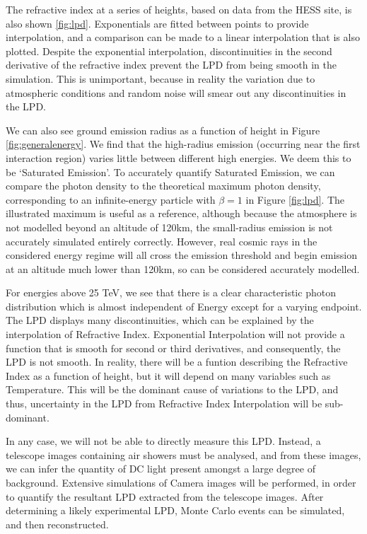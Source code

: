 \documentclass[11pt]{article}
\begin{document}
The refractive index at a series of heights, based on data from the HESS site, is also shown \ref{fig:lpd}. Exponentials are fitted between points to provide interpolation, and a comparison can be made to a linear interpolation that is also plotted. Despite the exponential interpolation, discontinuities in the second derivative of the refractive index prevent the LPD from being smooth in the simulation. This is unimportant, because in reality the variation due to atmospheric conditions and random noise will smear out any discontinuities in the LPD.

We can also see ground emission radius as a function of height in Figure \ref{fig:generalenergy}. We find that the high-radius emission (occurring near the first interaction region) varies little between different high energies. We deem this to be \textquoteleft Saturated Emission\textquoteright. To accurately quantify Saturated Emission, we can compare the photon density to the theoretical maximum photon density, corresponding to an infinite-energy particle with $\beta =1$ in Figure \ref{fig:lpd}. The illustrated maximum is useful as a reference, although because the atmosphere is not modelled beyond an altitude of 120km, the small-radius emission is not accurately simulated entirely correctly. However, real cosmic rays in the considered energy regime will all cross the emission threshold and begin emission at an altitude much lower than 120km, so can be considered accurately modelled.

For energies above 25 TeV, we see that there is a clear characteristic photon distribution which is almost independent of Energy except for a varying endpoint. The LPD displays many discontinuities, which can be explained by the interpolation of Refractive Index. Exponential Interpolation will not provide a function that is smooth for second or third derivatives, and consequently, the LPD is not smooth. In reality, there will be a funtion describing the Refractive Index as a function of height, but it will depend on many variables such as Temperature. This will be the dominant cause of variations to the LPD, and thus, uncertainty in the LPD from Refractive Index Interpolation will be sub-dominant.

In any case, we will not be able to directly measure this LPD. Instead, a telescope images containing air showers must be analysed, and from these images, we can infer the quantity of DC light present amongst a large degree of background. Extensive simulations of Camera images will be performed, in order to quantify the resultant LPD extracted from the telescope images. After determining a likely experimental LPD, Monte Carlo events can be simulated, and then reconstructed. 
\end{document}
